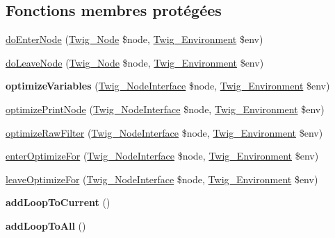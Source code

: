 \subsection*{Fonctions membres protégées}
\begin{DoxyCompactItemize}
\item 
\hyperlink{class_twig___node_visitor___optimizer_a58d59325d3add0c1004f6a5cfb2562af}{do\+Enter\+Node} (\hyperlink{class_twig___node}{Twig\+\_\+\+Node} \$node, \hyperlink{class_twig___environment}{Twig\+\_\+\+Environment} \$env)
\item 
\hyperlink{class_twig___node_visitor___optimizer_a7e9db0312cbd70344096235921930dd2}{do\+Leave\+Node} (\hyperlink{class_twig___node}{Twig\+\_\+\+Node} \$node, \hyperlink{class_twig___environment}{Twig\+\_\+\+Environment} \$env)
\item 
{\bfseries optimize\+Variables} (\hyperlink{interface_twig___node_interface}{Twig\+\_\+\+Node\+Interface} \$node, \hyperlink{class_twig___environment}{Twig\+\_\+\+Environment} \$env)\hypertarget{class_twig___node_visitor___optimizer_ae205530bb3c2c2d6a09bf576d1ae6734}{}\label{class_twig___node_visitor___optimizer_ae205530bb3c2c2d6a09bf576d1ae6734}

\item 
\hyperlink{class_twig___node_visitor___optimizer_ab78709a00556e7e1acfae524088c8db8}{optimize\+Print\+Node} (\hyperlink{interface_twig___node_interface}{Twig\+\_\+\+Node\+Interface} \$node, \hyperlink{class_twig___environment}{Twig\+\_\+\+Environment} \$env)
\item 
\hyperlink{class_twig___node_visitor___optimizer_a5e719232a12b2343be5df5762e134227}{optimize\+Raw\+Filter} (\hyperlink{interface_twig___node_interface}{Twig\+\_\+\+Node\+Interface} \$node, \hyperlink{class_twig___environment}{Twig\+\_\+\+Environment} \$env)
\item 
\hyperlink{class_twig___node_visitor___optimizer_a20bda337e18b18e6a0846c0588b91d6f}{enter\+Optimize\+For} (\hyperlink{interface_twig___node_interface}{Twig\+\_\+\+Node\+Interface} \$node, \hyperlink{class_twig___environment}{Twig\+\_\+\+Environment} \$env)
\item 
\hyperlink{class_twig___node_visitor___optimizer_aa054b24131ed6ca4d122776b9dceba3a}{leave\+Optimize\+For} (\hyperlink{interface_twig___node_interface}{Twig\+\_\+\+Node\+Interface} \$node, \hyperlink{class_twig___environment}{Twig\+\_\+\+Environment} \$env)
\item 
{\bfseries add\+Loop\+To\+Current} ()\hypertarget{class_twig___node_visitor___optimizer_a46f27e97af2bb857f9c6668bb0cf735c}{}\label{class_twig___node_visitor___optimizer_a46f27e97af2bb857f9c6668bb0cf735c}

\item 
{\bfseries add\+Loop\+To\+All} ()\hypertarget{class_twig___node_visitor___optimizer_abcc001ca4d4620ca8ef8844333bafa9a}{}\label{class_twig___node_visitor___optimizer_abcc001ca4d4620ca8ef8844333bafa9a}

\end{DoxyCompactItemize}
